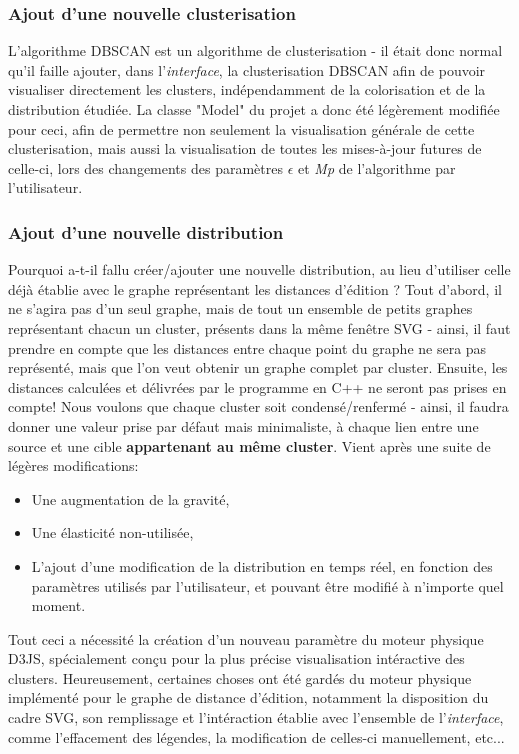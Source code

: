 \documentclass[12pt]{report}
\begin{document}
\begin{spacing}{1.2}
\subsubsection{Ajout d'une nouvelle clusterisation}

L'algorithme DBSCAN est un algorithme de clusterisation - il était donc normal qu'il faille ajouter, dans l'\textit{interface}, la clusterisation DBSCAN afin de pouvoir visualiser directement les clusters, indépendamment de la colorisation et de la distribution étudiée.
\newline
La classe "Model" du projet a donc été légèrement modifiée pour ceci, afin de permettre non seulement la visualisation générale de cette clusterisation, mais aussi la visualisation de toutes les mises-à-jour futures de celle-ci, lors des changements des paramètres $\epsilon$ et \textit{Mp} de l'algorithme par l'utilisateur.

\subsubsection{Ajout d'une nouvelle distribution}

Pourquoi a-t-il fallu créer/ajouter une nouvelle distribution, au lieu d'utiliser celle déjà établie avec le graphe représentant les distances d'édition ?
\newline
Tout d'abord, il ne s'agira pas d'un seul graphe, mais de tout un ensemble de petits graphes représentant chacun un cluster, présents dans la même fenêtre SVG - ainsi, il faut prendre en compte que les distances entre chaque point du graphe ne sera pas représenté, mais que l'on veut obtenir un graphe complet par cluster.
\newline
Ensuite, les distances calculées et délivrées par le programme en C++ ne seront pas prises en compte! Nous voulons que chaque cluster soit condensé/renfermé - ainsi, il faudra donner une valeur prise par défaut mais minimaliste, à chaque lien entre une source et une cible \textbf{appartenant au même cluster}.
\newline
Vient après une suite de légères modifications:
	\begin{itemize}
	\item{Une augmentation de la gravité,}
	\item{Une élasticité non-utilisée,}
	\item{L'ajout d'une modification de la distribution en temps réel, en fonction des paramètres utilisés par l'utilisateur, et pouvant être modifié à n'importe quel moment.}
	\end{itemize}
Tout ceci a nécessité la création d'un nouveau paramètre du moteur physique D3JS, spécialement conçu pour la plus précise visualisation intéractive des clusters.
\newline
Heureusement, certaines choses ont été gardés du moteur physique implémenté pour le graphe de distance d'édition, notamment la disposition du cadre SVG, son remplissage et l'intéraction établie avec l'ensemble de l'\textit{interface}, comme l'effacement des légendes, la modification de celles-ci manuellement, etc...


\end{spacing}
\end{document}
